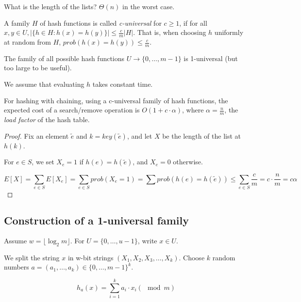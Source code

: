 What is the length of the lists? $\Theta(n)$ in the worst case.

\begin{mydefinition}
A family $H$ of hash functions is called \emph{c-universal} for $c \ge 1$, if for all $x,y\in U, |\{h\in H: h(x) = h(y)\}| \le \frac{c}{m} |H|$. That is, when choosing $h$ uniformly at random from $H$, ${prob}(h(x)=h(y)) \le \frac{c}{m}$.
\end{mydefinition}

\begin{myexample}
The family of all possible hash functions $U \rightarrow \{0, \ldots, m-1\}$ is 1-universal (but too large to be useful).
\end{myexample}

\noindent We assume that evaluating $h$ takes constant time.

\begin{mytheorem}
For hashing with chaining, using a c-universal family of hash functions, the expected cost of a search/remove operation is $O(1 + c \cdot \alpha)$, where
$\alpha = \frac{n}{m}$, the \emph{load factor} of the hash table.
\end{mytheorem}
\begin{proof}
Fix an element $\tilde{e}$ and $k = {key}(\tilde{e})$, and let $X$ be the length of the list at $h(k)$.

For $e \in S$, we set $X_e = 1$ if $h(e) = h(\tilde{e})$, and $X_e = 0$ otherwise.

$$E[X] = \sum_{e \in S} E[X_e] = \sum_{e \in S} {prob}(X_e=1) = \sum {prob}(h(e)=h(\tilde{e})) \le \sum_{e \in S} \frac{c}{m} = c \cdot \frac{n}{m} = c \alpha $$
\end{proof}

\subsection{Construction of a 1-universal family}

Assume $w = \lfloor \log_2 m \rfloor$. For $U = \{0, \ldots, u-1\}$, write $x \in U$.

\bigskip \noindent We split the string $x$ in w-bit strings $(X_1, X_2, X_3, \ldots, X_k)$.
Choose $k$ random numbers $a = (a_1, \ldots, a_k) \in \{0, \ldots, m-1\}^k$.

$$h_a(x) = \sum\limits_{i=1}^k a_i \cdot x_i (\mod m)$$

